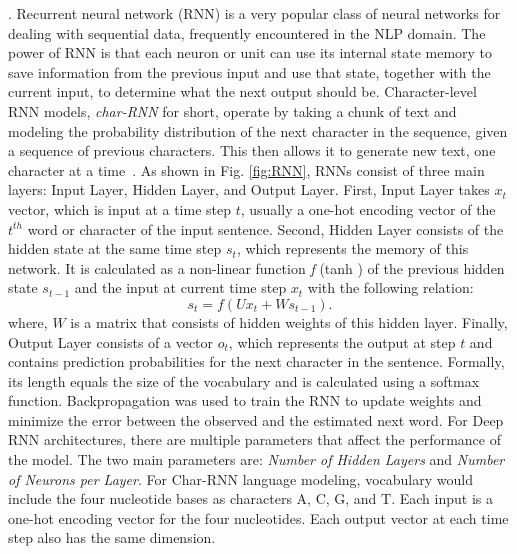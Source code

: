 .
Recurrent neural network (RNN) is a very popular class of neural networks for dealing with sequential data, frequently encountered in the NLP domain. The power of RNN is that each neuron or unit can use its internal state memory to save information from the previous input and use that state, together with the current input, to determine what the next output should be. %
Character-level RNN models, \textit{char-RNN} for short, operate by taking a chunk of text and modeling the probability distribution of the next character in the sequence, given a sequence of previous characters. This then allows it to generate new text, one character at a time~\cite{graves2013generating}.
As shown in Fig. \ref{fig:RNN}, RNNs consist of three main layers: Input Layer, Hidden Layer, and Output Layer.
First, Input Layer takes $ x_{t} $ vector, which is input at a time step $t$, usually a one-hot encoding vector of the $ t^{th} $ word or character of the input sentence. 
Second, Hidden Layer consists of the hidden state at the same time step $ s_{t} $, which represents the memory of this network. It is calculated as a non-linear function \textit{f} (\eg tanh ) of the previous hidden state $ s_{t-1} $ and the input at current time step $ x_{t} $ with the following relation: \begin{equation}
s_{t} = f(U x_{t} + W s_{t-1}).
\end{equation}
where, $W$ is a matrix that consists of hidden weights of this hidden layer.
Finally, Output Layer consists of a vector $ o_{t} $, which represents the output at step $t$ and contains prediction probabilities for the next character in the sentence. Formally, its length equals the size of the vocabulary and is calculated using a softmax function.
Backpropagation was used to train the RNN to update weights and minimize the error between the observed and the estimated next word. For Deep RNN architectures, there are multiple parameters that affect the performance of the model. The two main parameters are: \textit{Number of Hidden Layers} and \textit{Number of Neurons per Layer}. For Char-RNN language modeling, vocabulary would include the four nucleotide bases as characters {A, C, G, and T}. Each input is a one-hot encoding vector for the four nucleotides.
Each output vector at each time step also has the same dimension.  


